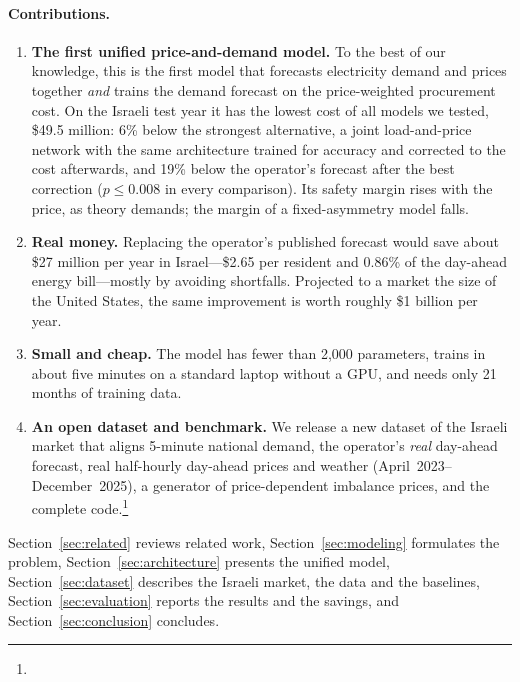 \paragraph*{Contributions.}
\begin{enumerate}
    \item \textbf{The first unified price-and-demand model.}  To the best of
          our knowledge, this is the first model that forecasts electricity
          demand and prices together \emph{and} trains the demand forecast on
          the price-weighted procurement cost.  On the Israeli test year it
          has the lowest cost of all models we tested, \$49.5 million: 6\%
          below the strongest alternative, a joint load-and-price network with
          the same architecture trained for accuracy and corrected to the cost
          afterwards, and 19\% below the operator's forecast after the best
          correction ($p\le0.008$ in every comparison).  Its safety margin
          rises with the price, as theory demands; the margin of a
          fixed-asymmetry model falls.

    \item \textbf{Real money.}  Replacing the operator's published forecast
          would save about \$27 million per year in Israel---\$2.65 per
          resident and 0.86\% of the day-ahead energy bill---mostly by
          avoiding shortfalls.  Projected to a market the size of the United
          States, the same improvement is worth roughly \$1 billion per year.

    \item \textbf{Small and cheap.}  The model has fewer than 2{,}000
          parameters, trains in about five minutes on a standard laptop
          without a GPU, and needs only 21 months of training data.

    \item \textbf{An open dataset and benchmark.}  We release a new dataset of
          the Israeli market that aligns 5-minute national demand, the
          operator's \emph{real} day-ahead forecast, real half-hourly
          day-ahead prices and weather (April~2023--December~2025), a
          generator of price-dependent imbalance prices, and the complete
          code.\footnote{\codeurl}
\end{enumerate}

Section~\ref{sec:related} reviews related work, Section~\ref{sec:modeling}
formulates the problem, Section~\ref{sec:architecture} presents the unified
model, Section~\ref{sec:dataset} describes the Israeli market, the data and the baselines,
Section~\ref{sec:evaluation} reports the results and the savings, and
Section~\ref{sec:conclusion} concludes.
